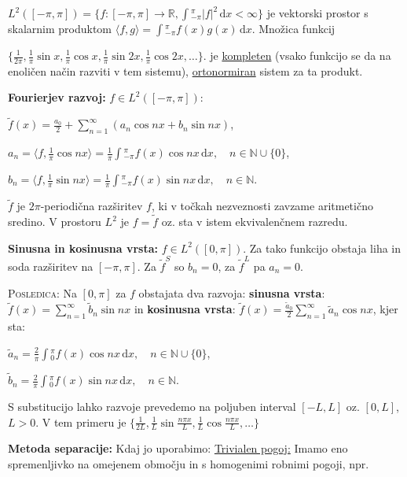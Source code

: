 \documentclass[8pt,a4paper]{amsart}
\theoremstyle{definition} %
\theoremstyle{plain} %
\newcommand{\dx}{\ensuremath{\,\mathrm{d}x}}
\let\oldint\int
\renewcommand{\int}{\oldint \!}
\newcommand{\R}{\mathbb R}
\newcommand{\N}{\mathbb N}
\begin{document}
$L^2([-\pi,\pi]) = \{f:[-\pi,\pi]\longrightarrow \R, \int_{-\pi}^\pi |f|^2
\dx < \infty \}$ je vektorski prostor s skalarnim produktom $\langle f, g\rangle =
\int_{-\pi}^\pi f(x)g(x)\dx$. Množica funkcij

  $\{\frac{1}{2\pi},
  \frac{1}{\pi}\sin{x},\frac{1}{\pi}\cos{x},\frac{1}{\pi}\sin{2x},\frac{1}{\pi}\cos{2x},\ldots
\}$. je \underline{kompleten} (vsako funkcijo se da na enoličen način razviti v
tem sistemu),  \underline{ortonormiran} sistem za ta produkt.

\textbf{Fourierjev razvoj:} $f \in L^2([-\pi,\pi])$:

$\tilde{f}(x) = \frac{a_0}{2} + \sum_{n=1}^{\infty}(a_n\cos{nx} + b_n\sin{nx})$,

$a_n = \langle f,\frac{1}{\pi}\cos{nx} \rangle =
\frac{1}{\pi}\int_{-\pi}^{\pi}f(x)\cos{nx}\dx, \quad n \in \N \cup
\{0\}$,

$b_n = \langle f,\frac{1}{\pi}\sin{nx} \rangle =
\frac{1}{\pi}\int_{-\pi}^{\pi}f(x)\sin{nx}\dx, \quad n \in \N$.

$\tilde{f}$ je $2\pi$-periodična razširitev $f$, ki v točkah nezveznosti zavzame
aritmetično sredino. V prostoru $L^2$ je $f=\tilde{f}$ oz. sta v istem
ekvivalenčnem razredu.

\textbf{Sinusna in kosinusna vrsta:} $f \in L^2([0,\pi])$. Za tako funkcijo
obstaja liha in soda razširitev na $[-\pi,\pi]$. Za $\tilde{f}^S$ so $b_n = 0$,
za $\tilde{f}^L$ pa $a_n = 0$.

\textsc{Posledica:} Na $[0,\pi]$ za $f$ obstajata dva razvoja: \textbf{sinusna
vrsta}: $\tilde{f}(x) =  \sum_{n=1}^{\infty} \tilde{b}_n\sin{nx}$ in
\textbf{kosinusna vrsta}:  $\tilde{f}(x) =
\frac{\tilde{a}_0}{2}\sum_{n=1}^{\infty}\tilde{a}_n\cos{nx}$, kjer sta:

$\tilde{a}_n = \frac{2}{\pi}\int_0^{\pi}f(x)\cos{nx}\dx, \quad n \in \N
\cup \{0\}$,

$\tilde{b}_n = \frac{2}{\pi}\int_0^{\pi}f(x)\sin{nx}\dx, \quad n \in
\N$.

S substitucijo lahko razvoje prevedemo na poljuben interval $[-L,L]$ oz.
$[0,L]$, $L > 0$. V tem primeru je $\{\frac{1}{2L}, \frac{1}{L}\sin{\frac{n\pi
x}{L}},\frac{1}{L}\cos{\frac{n\pi x}{L}},\ldots \}$


\textbf{Metoda separacije:} Kdaj jo uporabimo: \underline{Trivialen pogoj:}
Imamo eno spremenljivko na omejenem območju in s homogenimi robnimi pogoji, npr.
\end{document}
